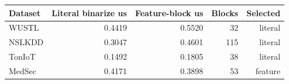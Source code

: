 \begin{tabular}{lrrrr}
\toprule
Dataset & Literal binarize us & Feature-block us & Blocks & Selected \\
\midrule
WUSTL & 0.4419 & 0.5520 & 32 & literal \\
NSLKDD & 0.3047 & 0.4601 & 115 & literal \\
TonIoT & 0.1492 & 0.1805 & 38 & literal \\
MedSec & 0.4171 & 0.3898 & 53 & feature \\
\bottomrule
\end{tabular}
